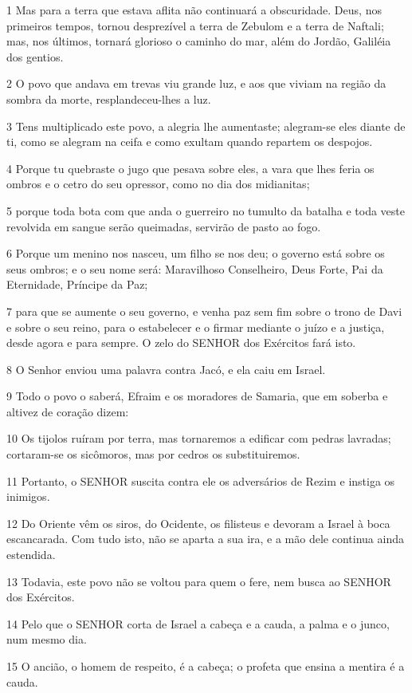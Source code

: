 \par 1 Mas para a terra que estava aflita não continuará a obscuridade. Deus, nos primeiros tempos, tornou desprezível a terra de Zebulom e a terra de Naftali; mas, nos últimos, tornará glorioso o caminho do mar, além do Jordão, Galiléia dos gentios.
\par 2 O povo que andava em trevas viu grande luz, e aos que viviam na região da sombra da morte, resplandeceu-lhes a luz.
\par 3 Tens multiplicado este povo, a alegria lhe aumentaste; alegram-se eles diante de ti, como se alegram na ceifa e como exultam quando repartem os despojos.
\par 4 Porque tu quebraste o jugo que pesava sobre eles, a vara que lhes feria os ombros e o cetro do seu opressor, como no dia dos midianitas;
\par 5 porque toda bota com que anda o guerreiro no tumulto da batalha e toda veste revolvida em sangue serão queimadas, servirão de pasto ao fogo.
\par 6 Porque um menino nos nasceu, um filho se nos deu; o governo está sobre os seus ombros; e o seu nome será: Maravilhoso Conselheiro, Deus Forte, Pai da Eternidade, Príncipe da Paz;
\par 7 para que se aumente o seu governo, e venha paz sem fim sobre o trono de Davi e sobre o seu reino, para o estabelecer e o firmar mediante o juízo e a justiça, desde agora e para sempre. O zelo do SENHOR dos Exércitos fará isto.
\par 8 O Senhor enviou uma palavra contra Jacó, e ela caiu em Israel.
\par 9 Todo o povo o saberá, Efraim e os moradores de Samaria, que em soberba e altivez de coração dizem:
\par 10 Os tijolos ruíram por terra, mas tornaremos a edificar com pedras lavradas; cortaram-se os sicômoros, mas por cedros os substituiremos.
\par 11 Portanto, o SENHOR suscita contra ele os adversários de Rezim e instiga os inimigos.
\par 12 Do Oriente vêm os siros, do Ocidente, os filisteus e devoram a Israel à boca escancarada. Com tudo isto, não se aparta a sua ira, e a mão dele continua ainda estendida.
\par 13 Todavia, este povo não se voltou para quem o fere, nem busca ao SENHOR dos Exércitos.
\par 14 Pelo que o SENHOR corta de Israel a cabeça e a cauda, a palma e o junco, num mesmo dia.
\par 15 O ancião, o homem de respeito, é a cabeça; o profeta que ensina a mentira é a cauda.
